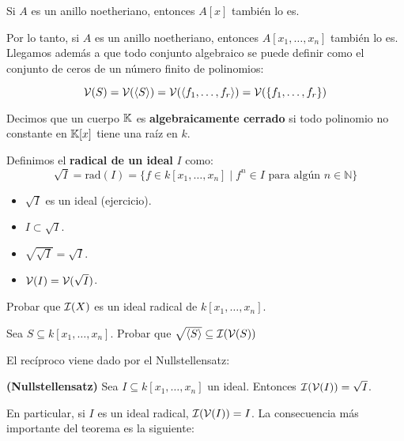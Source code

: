 \documentclass[ACGA.tex]{subfiles}
\begin{document}
\begin{teorema}
Si $A$ es un anillo noetheriano, entonces $A[x]$ también lo es.
\end{teorema}

Por lo tanto, si $A$ es un anillo noetheriano, entonces $A[x_1,\dots,x_n]$ también lo es. Llegamos además a que todo conjunto algebraico se puede definir como el conjunto de ceros de un número finito de polinomios:

\[ \mathcal{V}(S) = \mathcal{V}(\langle S \rangle) = \mathcal{V}(\langle f_1,\dots,f_r\rangle) =  \mathcal{V}(\{f_1,\dots,f_r\}) \]

\begin{defi}
Decimos que un cuerpo $\mathbb{K}$ es \textbf{algebraicamente cerrado} si todo polinomio no constante en $\mathbb{K}[x]$ tiene una raíz en $k$.
\end{defi}

\begin{defi}\label{radical}
Definimos el \textbf{radical de un ideal} $I$ como:
\[ \sqrt{I} = \text{rad}(I) = \{f \in k[x_1,\dots,x_n] \mid f^n \in I \text{ para algún }n \in \mathbb{N}\} \]
\end{defi}

\begin{propi}\mbox{}
\begin{itemize}
	\item $\sqrt{I}$ es un ideal (ejercicio).
	\item $I \subset \sqrt{I}$.
	\item $\sqrt{\sqrt{I}} = \sqrt{I}$.
	\item $\mathcal{V}(I) = \mathcal{V}(\sqrt{I})$.
\end{itemize}
\end{propi}

\begin{ejer} Probar que $\mathcal{I}(X)$ es un ideal radical de $k[x_1,\ldots,x_n]$.
 \end{ejer}

\begin{ejer}
 Sea $S\subseteq k[x_1,\ldots,x_n]$. Probar que $\sqrt{\langle S\rangle}\subseteq \mathcal{I}(\mathcal{V}(S))$
\end{ejer}

El recíproco viene dado por el Nullstellensatz:

\begin{teorema}\label{Null} {\bf (Nullstellensatz)} Sea $I\subseteq k[x_1,\ldots,x_n]$ un ideal. Entonces $\mathcal{I}(\mathcal{V}(I))=\sqrt{I}$.
\end{teorema}

En particular, si $I$ es un ideal radical, $\mathcal{I}(\mathcal{V}(I))=I$. La consecuencia más importante del teorema es la siguiente:
\end{document}
